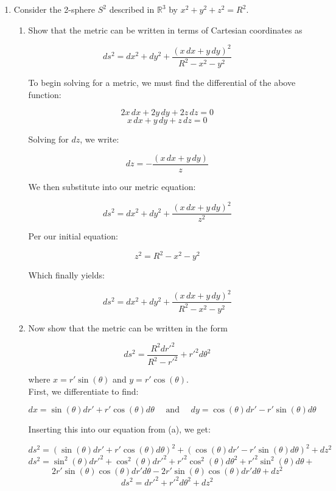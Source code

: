 \begin{enumerate}
  \item Consider the 2-sphere $S^2$ described in $\mathbb{R}^3$ by $x^2+y^2+z^2=R^2$.

    \begin{enumerate}

      \item Show that the metric can be written in terms of Cartesian coordinates as 

        $$ds^2 = dx^2 + dy^2 + \dfrac{(x\,dx + y\,dy)^2}{R^2-x^2-y^2}$$

        To begin solving for a metric, we must find the differential of the above function:

        $$2x\,dx+2y\,dy+2z\,dz=0$$
        $$x\,dx+y\,dy+z\,dz=0$$

        Solving for $dz$, we write:

        $$dz=-\frac{(x\,dx+y\,dy)}{z}$$

        We then substitute into our metric equation:

        $$ds^2=dx^2+dy^2+\frac{(x\,dx+y\,dy)^2}{z^2}$$

        Per our initial equation:

        $$z^2=R^2-x^2-y^2$$

        Which finally yields:

        $$\boxed{ds^2=dx^2+dy^2+\frac{(x\,dx+y\,dy)^2}{R^2-x^2-y^2}}$$

      \item Now show that the metric can be written in the form 
        
        $$ds^2=\dfrac{R^2dr\prime^2}{R^2-r\prime^2}+ r\prime^2d\theta^2$$

        where $x=r\prime\sin(\theta)$ and $y=r\prime\cos(\theta)$.\\

        First, we differentiate to find:

        $$dx=\sin(\theta)dr\prime+r\prime\cos(\theta)d\theta\quad\text{ and }\quad dy=\cos(\theta)dr\prime-r\prime\sin(\theta)d\theta$$

        Inserting this into our equation from (a), we get:

        $$ds^2=(\sin(\theta)dr\prime+r\prime\cos(\theta)d\theta)^2+(\cos(\theta)dr\prime-r\prime\sin(\theta)d\theta)^2+dz^2$$
        $$ds^2=\sin^2(\theta)dr\prime^2+\cos^2(\theta)dr\prime^2+r\prime^2\cos^2(\theta)d\theta^2+r\prime^2\sin^2(\theta)d\theta+$$
        $$2r\prime\sin(\theta)\cos(\theta)dr\prime d\theta-2r\prime\sin(\theta)\cos(\theta)dr\prime d\theta+dz^2$$
        $$ds^2=dr\prime^2+r\prime^2d\theta^2+dz^2$$


\end{enumerate}
\end{enumerate}
